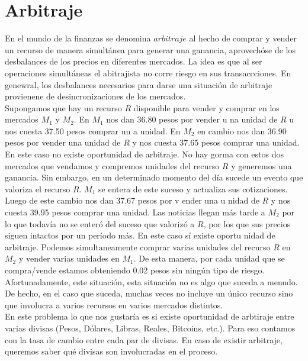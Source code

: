 \documentclass[11pt,a4paper]{article}
\begin{document}
\section{Arbitraje}

En el mundo de la finanzas se denomina $arbitraje$ al hecho de comprar y vender un recurso de manera simult\'anea para generar una ganancia, aprovech\'ose de los desbalances de los precios en diferentes mercados. La idea es que al ser operaciones simult\'aneas el abitrajista no corre riesgo en sus transaccciones. En genewral, los desbalances necesarios para darse una situaci\'on de arbitraje provienene de desincronizaciones de los mercados.
\\

Supongamos que hay un recurso $R$ disponible para vender y comprar en los mercados $M_{1}$ y $M_{2}$. En $M_{1}$ nos dan 36.80 pesos por vender u na unidad de $R$ u nos cuesta 37.50 pesos comprar un a unidad. En $M_{2}$ en cambio nos dan 36.90 pesos por vender una unidad  de $R$ y nos cuesta 37.65 pesos comprar una unidad. En este caso no existe oportunidad de arbitraje. No hay gorma con estos dos mercados que vendamos y compremos unidades del recurso $R$ y generemos una ganancia. Sin embargo, en un determinado momento del d\'ia sucede un evento que valoriza el recurso $R$. $M_{1}$ se entera de este suceso y actualiza sus cotizaciones. Luego de este cambio nos dan 37.67 pesos por v ender una u nidad de $R$ y nos cuesta 39.95 pesos comprar una unidad. Las noticias llegan m\'as tarde a $M_{2}$ por lo que todav\'ia no se enter\'o del suceso que valoriz\'o a $R$, por los que sus precios siguen intactos por un per\'iodo m\'as. En este caso s\'i existe oportu nidad de arbitraje.  Podemos simultaneamente comprar varias unidades del recurso $R$ en $M_{2}$ y vender varias unidades en $M_{1}$. De esta manera, por cada unidad que se compra/vende estamos obteniendo 0.02 pesos sin ning\'un tipo de riesgo.
\\

Afortunadamente, este situaci\'on, esta situaci\'on no es algo que suceda a menudo. De hecho, en el caso que suceda, muchas veces no incluye un \'unico recurso sino que involucra a varios recursos en varios mercados distintos.
\\

En este problema lo que nos gustar\'ia es si existe oportunidad de arbtiraje entre varias divisas (Pesos, D\'olares, Libras, Reales, Bitcoins, etc.). Para eso contamos con la tasa de cambio entre cada par de divisas. En caso de existir arbitraje, queremos saber qu\'e divisas son involucradas en el proceso.
\\
\end{document}
